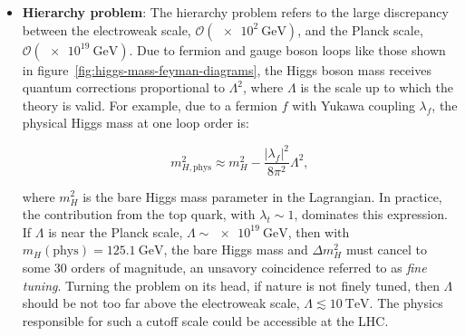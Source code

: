 \begin{itemize}
	\item \textbf{Hierarchy problem}: The hierarchy problem refers to the large discrepancy between the electroweak scale, $\mathcal{O}(\SI{e2}{\giga\electronvolt})$, and the Planck scale, $\mathcal{O}(\SI{e19}{\giga\electronvolt})$. Due to fermion and gauge boson loops like those shown in figure~\ref{fig:higgs-mass-feyman-diagrams}, the Higgs boson mass receives quantum corrections proportional to $\Lambda^2$, where $\Lambda$ is the scale up to which the theory is valid. For example, due to a fermion $f$ with Yukawa coupling $\lambda_f$, the physical Higgs mass at one loop order is:

	\begin{equation}\label{eqn:higgs-mass-divergence}
		m_{H,\mathrm{phys}}^2 \approx m_{H}^2 -\frac{|\lambda_f|^2}{8\pi^2} \Lambda^2,
	\end{equation}

	where $m_{H}^2$ is the bare Higgs mass parameter in the Lagrangian. In practice, the contribution from the top quark, with $\lambda_t\sim1$, dominates this expression. If $\Lambda$ is near the Planck scale, $\Lambda\sim\SI{e19}{\giga\electronvolt}$, then with $m_H(\mathrm{phys})=\SI{125.1}{\giga\electronvolt}$, the bare Higgs mass and $\Delta m_H^2$ must cancel to some 30 orders of magnitude, an unsavory coincidence referred to as \emph{fine tuning}. Turning the problem on its head, if nature is not finely tuned, then $\Lambda$ should be not too far above the electroweak scale, $\Lambda \lesssim \SI{10}{\tera\electronvolt}$. The physics responsible for such a cutoff scale could be accessible at the LHC. 


\end{itemize}
